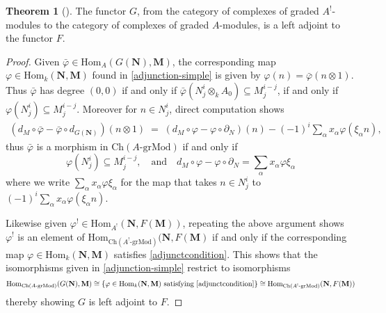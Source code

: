 \documentclass[a4paper]{article}
\theoremstyle{definition}
\newtheorem{theorem}[defn]{Theorem}
\theoremstyle{remark}
\newcommand{\grMod}{\ensuremath{\text{-grMod}}}
\newcommand{\Ch}{\ensuremath{\text{Ch}}}
\newcommand{\Hom}{\ensuremath{\text{Hom}}}
\begin{document}
\begin{theorem}[] \label{adjunction}
    The functor \(G\), from the category of complexes of graded \(A^!\)-modules
    to the category of complexes of graded \(A\)-modules, is a left adjoint to
    the functor \(F\).
    \begin{proof}
        Given \(\bar{\varphi}\in \Hom_{A}(G(\mathbf{N}),
        \mathbf{M})\), the corresponding map \(\varphi\in
        \Hom_k(\mathbf{N},\mathbf{M})\) found in \cref{adjunction-simple} is
        given by \(\varphi(n)=\bar\varphi(n\otimes 1)\). Thus \(\bar\varphi\)
        has degree \((0,0)\) if and only if \(\bar\varphi(N^i_j \otimes_k A_0)
        \subseteq M^{i-j}_j\), if and only if \(\varphi(N^i_j)\subseteq
        M^{i-j}_j\).  Moreover for \(n\in N^i_j\), direct computation shows
        \begin{align*}
            (d_M \circ \bar\varphi - \bar\varphi \circ d_{G(\mathbf{N})}) (n
            \otimes 1) \; = \; (d_M \circ \varphi - \varphi \circ
            \partial_N) (n) - (-1)^i \sum_\alpha x_\alpha \varphi(\xi_\alpha n),
        \end{align*}
        thus \(\bar\varphi\) is a morphism in \(\Ch(A\grMod)\) if and only if
        \begin{equation}\label{adjunctcondition}
            \varphi(N^i_j)\subseteq M^{i-j}_j, \quad \text{and} \quad d_M\circ
            \varphi - \varphi \circ \partial_N = \sum_\alpha x_\alpha \varphi
            \xi_\alpha        
        \end{equation}
        where we write \(\sum_\alpha x_\alpha\varphi \xi_\alpha\) for the map
        that takes \(n\in N^i_j\) to \((-1)^i\sum_\alpha x_\alpha
        \varphi(\xi_\alpha n)\).

        Likewise given \(\varphi^!\in \Hom_{A^!}(\mathbf{N},F(\mathbf{M}))\),
        repeating the above argument shows \(\varphi^!\) is an element of
        \(\Hom_{\Ch(A^!\grMod)}(\mathbf{N},F(\mathbf{M})\) if and only if
        the corresponding map \(\varphi \in \Hom_k(\mathbf{N},\mathbf{M})\)
        satisfies \eqref{adjunctcondition}. This shows that the isomorphisms
        given in \cref{adjunction-simple} restrict to isomorphisms
        \[\Hom_{\Ch(A\grMod)}(G(\mathbf{N}),\mathbf{M})\cong \{\varphi\in \Hom_k(\mathbf{N},\mathbf{M}) \text{ satisfying \eqref{adjunctcondition}}\} \cong \Hom_{\Ch(A^!\grMod)}(\mathbf{N},F(\mathbf{M})) \]
        thereby showing \(G\) is left adjoint to \(F\).
    \end{proof}
\end{theorem}
\end{document}
